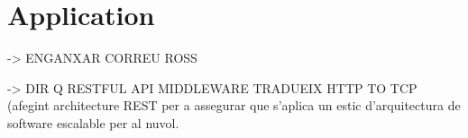 \chapter{Application}\label{D:application}

-> ENGANXAR CORREU ROSS

-> DIR Q RESTFUL API MIDDLEWARE TRADUEIX HTTP TO TCP (afegint architecture REST per a assegurar que s'aplica un estic d'arquitectura de software escalable per al nuvol.